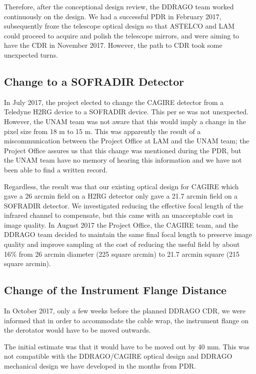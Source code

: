 \documentclass{article}
\newcommand{\micron}{\mbox{\textmu m}}
\begin{document}
Therefore, after the conceptional design review, the DDRAGO team worked continuously on the design. We had a successful PDR in February 2017, subsequently froze the telescope optical design so that ASTELCO and LAM could proceed to acquire and polish the telescope mirrors, and were aiming to have the CDR in November 2017. However, the path to CDR took some unexpected turns.

\subsection{Change to a SOFRADIR Detector}

In July 2017, the project elected to change the CAGIRE detector from a Teledyne H2RG device to a SOFRADIR device. This per se was not unexpected. However, the UNAM team was not aware that this would imply a change in the pixel size from 18 {\micron} to 15 {\micron}. This was apparently the result of a miscommunication between the Project Office at LAM and the UNAM team; the Project Office assures us that this change was mentioned during the PDR, but the UNAM team have no memory of hearing this information and we have not been able to find a written record. 

Regardless, the result was that our existing optical design for CAGIRE which gave a 26 arcmin field on a H2RG detector only gave a 21.7 arcmin field on a SOFRADIR detector. We investigated reducing the effective focal length of the infrared channel to compensate, but this came with an unacceptable cost in image quality. In August 2017 the Project Office, the CAGIRE team, and the DDRAGO team decided to maintain the same final focal length to preserve image quality and improve sampling at the cost of reducing the useful field by about 16\% from 26 arcmin diameter (225 square arcmin) to 21.7 arcmin square (215 square arcmin).

\subsection{Change of the Instrument Flange Distance}

In October 2017, only a few weeks before the planned DDRAGO CDR, we were informed that in order to accommodate the cable wrap, the instrument flange on the derotator would have to be moved outwards. 

The initial estimate was that it would have to be moved out by 40 mm. This was not compatible with the DDRAGO/CAGIRE optical design and DDRAGO mechanical design we have developed in the months from PDR.
\end{document}
